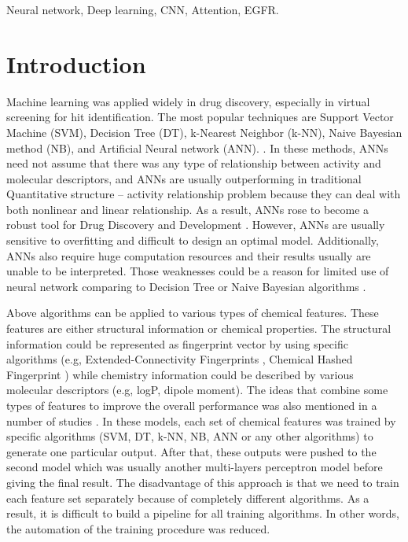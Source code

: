 \documentclass[conference]{IEEEtran}
\begin{document}
\begin{IEEEkeywords}
Neural network, Deep learning, CNN, Attention, EGFR.
\end{IEEEkeywords}



\section{Introduction}
Machine learning was applied widely in drug discovery, especially in virtual screening for hit identification. The most popular techniques are Support Vector Machine (SVM), Decision Tree (DT), k-Nearest Neighbor (k-NN), Naive Bayesian method (NB), and Artificial Neural network (ANN). \cite{Lavecchia2015}. In these methods, ANNs need not assume that there was any type of relationship between activity and molecular descriptors, and ANNs are usually outperforming in traditional Quantitative structure -- activity relationship problem because they can deal with both nonlinear and linear relationship. As a result, ANNs rose to become a robust tool for Drug Discovery and Development \cite{Winkler2004}. However, ANNs are usually sensitive to overfitting and difficult to design an optimal model. Additionally, ANNs also require huge computation resources and their results usually are unable to be interpreted. Those weaknesses could be a reason for limited use of neural network comparing to Decision Tree or Naive Bayesian algorithms \cite{Winkler2004, Lavecchia2015}.

Above algorithms can be applied to various types of chemical features. These features are either structural information or chemical properties. The structural information could be represented as fingerprint vector by using specific algorithms (e.g, Extended-Connectivity Fingerprints \cite{Rogers2010}, Chemical Hashed Fingerprint \cite{Al-Lazikani2004}) while chemistry information could be described by various molecular descriptors (e.g, logP, dipole moment). The ideas that combine some types of features to improve the overall performance was also mentioned in a number of studies \cite{Koch2013, Koch2013a}. In these models, each set of chemical features was trained by specific algorithms (SVM, DT, k-NN, NB, ANN or any other algorithms) to generate one particular output. After that, these outputs were pushed to the second model which was usually another multi-layers perceptron model before giving the final result. The disadvantage of this approach is that we need to train each feature set separately because of completely different algorithms. As a result, it is difficult to build a pipeline for all training algorithms. In other words, the automation of the training procedure was reduced. 
\end{document}

